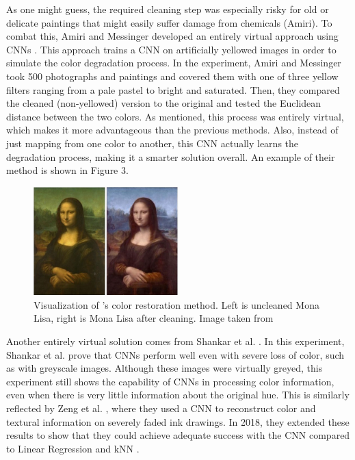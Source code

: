 \documentclass[a4paper,11pt]{article}
\begin{document}
As one might guess, the required cleaning step was especially risky for old or delicate paintings that might easily suffer damage from chemicals (Amiri). To combat this, Amiri and Messinger developed an entirely virtual approach using CNNs \cite{amiri}. This approach trains a CNN on artificially yellowed images in order to simulate the color degradation process. In the experiment, Amiri and Messinger took 500 photographs and paintings and covered them with one of three yellow filters ranging from a pale pastel to bright and saturated. Then, they compared the cleaned (non-yellowed) version to the original and tested the Euclidean distance between the two colors. As mentioned, this process was entirely virtual, which makes it more advantageous than the previous methods. Also, instead of just mapping from one color to another, this CNN actually learns the degradation process, making it a smarter solution overall. An example of their method is shown in Figure 3. 

\begin{figure}[h]
    \centering
    \includegraphics[width=0.5\textwidth]{mona.png}
    \caption{Visualization of \cite{amiri}'s color restoration method. Left is uncleaned Mona Lisa, right is Mona Lisa after cleaning. Image taken from \cite{amiri}}
\end{figure}

Another entirely virtual solution comes from Shankar et al. \cite{shankar}. In this experiment, Shankar et al. prove that CNNs perform well even with severe loss of color, such as with greyscale images. Although these images were virtually greyed, this experiment still shows the capability of CNNs in processing color information, even when there is very little information about the original hue. This is similarly reflected by Zeng et al. \cite{zeng2016}, where they used a CNN to reconstruct color and textural information on severely faded ink drawings. In 2018, they extended these results to show that they could achieve adequate success with the CNN compared to Linear Regression and kNN \cite{zeng2018}.
\end{document}
